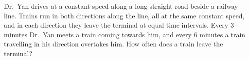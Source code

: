 Dr.\ Yan drives at a constant speed along a long straight road beside a railway line. Trains run in both directions along the line, all at the same constant speed, and in each direction they leave the terminal at equal time intervals. Every $3$ minutes Dr.\ Yan meets a train coming towards him, and every $6$ minutes a train travelling in his direction overtakes him. How often does a train leave the terminal?
